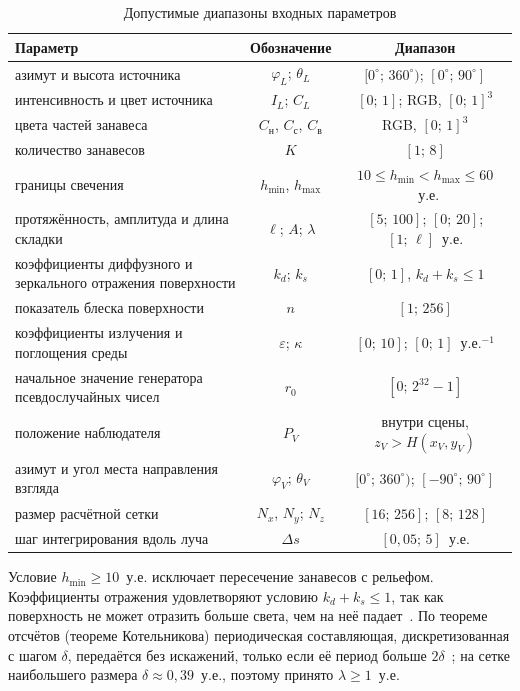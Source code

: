 \begin{table}[H]
	\caption{Допустимые диапазоны входных параметров}
	\label{tab:input-ranges}
	\begin{tabular}{|L{0.42}|C{0.22}|C{0.35}|}
		\hline
		Параметр & Обозначение & Диапазон \\
		\hline
		азимут и высота источника & $\varphi_L$; $\theta_L$ & $[0^\circ;\,360^\circ)$; $[0^\circ;\,90^\circ]$ \\
		\hline
		интенсивность и цвет источника & $I_L$; $C_L$ & $[0;\,1]$; RGB, $[0;\,1]^3$ \\
		\hline
		цвета частей занавеса & $C_{\text{н}}$, $C_{\text{с}}$, $C_{\text{в}}$ & RGB, $[0;\,1]^3$ \\
		\hline
		количество занавесов & $K$ & $[1;\,8]$ \\
		\hline
		границы свечения & $h_{\min}$, $h_{\max}$ & $10 \leqslant h_{\min} < h_{\max} \leqslant 60$~у.е. \\
		\hline
		протяжённость, амплитуда и длина складки & $\ell$; $A$; $\lambda$ & $[5;\,100]$; $[0;\,20]$; $[1;\,\ell]$~у.е. \\
		\hline
		коэффициенты диффузного и зеркального отражения поверхности & $k_d$; $k_s$ & $[0;\,1]$, $k_d + k_s \leqslant 1$ \\
		\hline
		показатель блеска поверхности & $n$ & $[1;\,256]$ \\
		\hline
		коэффициенты излучения и поглощения среды & $\varepsilon$; $\kappa$ & $[0;\,10]$; $[0;\,1]$~у.е.$^{-1}$ \\
		\hline
		начальное значение генератора псевдослучайных чисел & $r_0$ & $[0;\,2^{32} - 1]$ \\
		\hline
		положение наблюдателя & $P_V$ & внутри сцены, $z_V > H(x_V, y_V)$ \\
		\hline
		азимут и угол места направления взгляда & $\varphi_V$; $\theta_V$ & $[0^\circ;\,360^\circ)$; $[-90^\circ;\,90^\circ]$ \\
		\hline
		размер расчётной сетки & $N_x$, $N_y$; $N_z$ & $[16;\,256]$; $[8;\,128]$ \\
		\hline
		шаг интегрирования вдоль луча & $\Delta s$ & $[0{,}05;\,5]$~у.е. \\
		\hline
	\end{tabular}
\end{table}

Условие $h_{\min} \geqslant 10$~у.е. исключает пересечение занавесов с рельефом. Коэффициенты отражения удовлетворяют условию $k_d + k_s \leqslant 1$, так как поверхность не может отразить больше света, чем на неё падает~\cite[с.~385]{rogers1989}. По теореме отсчётов (теореме Котельникова) периодическая составляющая, дискретизованная с шагом $\delta$, передаётся без искажений, только если её период больше $2\delta$~\cite[с.~261--264]{gonzalez2012}; на сетке наибольшего размера $\delta \approx 0{,}39$~у.е., поэтому принято $\lambda \geqslant 1$~у.е.


